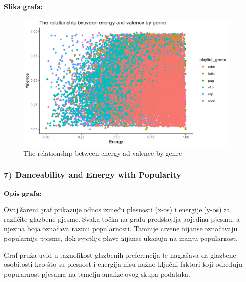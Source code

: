     \textbf{Slika grafa:}
    \begin{figure}[H]
        \includegraphics[scale=0.9]{slike/The relationship between energy and valence by genre.png}
        \centering
        \caption{The relationship between energy ad valence by genre}
        
    \end{figure}

	
		\subsubsection{7) Danceability and Energy with Popularity}
	
	\textbf{Opis grafa:}
	
	Ovaj šareni graf prikazuje odnos između plesnosti (x-os) i energije (y-os) za različite glazbene pjesme. Svaka točka na grafu predstavlja pojedinu pjesmu, a njezina boja označava razinu popularnosti. Tamnije crvene nijanse označavaju popularnije pjesme, dok svjetlije plave nijanse ukazuju na manju popularnost.
	
	Graf pruža uvid u raznolikost glazbenih preferencija te naglašava da glazbene osobitosti kao što su plesnost i energija nisu nužno ključni faktori koji određuju popularnost pjesama na temelju analize ovog skupa podataka.
	
